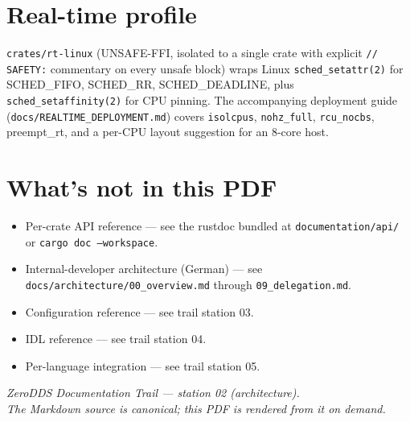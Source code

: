 \documentclass[11pt,a4paper]{article}
\begin{document}
\section{Real-time profile}

\texttt{crates/rt-linux} (UNSAFE-FFI, isolated to a single crate
with explicit \texttt{// SAFETY:} commentary on every unsafe
block) wraps Linux \texttt{sched\_setattr(2)} for SCHED\_FIFO,
SCHED\_RR, SCHED\_DEADLINE, plus \texttt{sched\_setaffinity(2)}
for CPU pinning. The accompanying deployment guide
(\texttt{docs/REALTIME\_DEPLOYMENT.md}) covers
\texttt{isolcpus}, \texttt{nohz\_full}, \texttt{rcu\_nocbs},
preempt\_rt, and a per-CPU layout suggestion for an 8-core host.

\section{What's not in this PDF}

\begin{itemize}[leftmargin=*]
  \item Per-crate API reference — see the rustdoc bundled at
        \texttt{documentation/api/} or
        \texttt{cargo doc --workspace}.
  \item Internal-developer architecture (German) — see
        \texttt{docs/architecture/00\_overview.md} through
        \texttt{09\_delegation.md}.
  \item Configuration reference — see trail station 03.
  \item IDL reference — see trail station 04.
  \item Per-language integration — see trail station 05.
\end{itemize}

\vfill
\begin{center}
\itshape ZeroDDS Documentation Trail — station 02 (architecture).\\
The Markdown source is canonical; this PDF is rendered from it
on demand.
\end{center}
\end{document}
